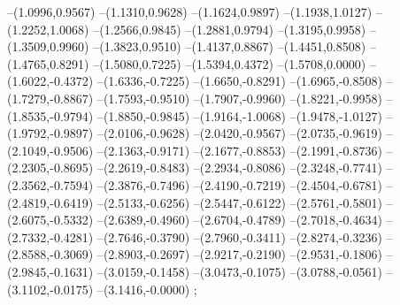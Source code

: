 {--(1.0996,0.9567)
--(1.1310,0.9628)
--(1.1624,0.9897)
--(1.1938,1.0127)
--(1.2252,1.0068)
--(1.2566,0.9845)
--(1.2881,0.9794)
--(1.3195,0.9958)
--(1.3509,0.9960)
--(1.3823,0.9510)
--(1.4137,0.8867)
--(1.4451,0.8508)
--(1.4765,0.8291)
--(1.5080,0.7225)
--(1.5394,0.4372)
--(1.5708,0.0000)
--(1.6022,-0.4372)
--(1.6336,-0.7225)
--(1.6650,-0.8291)
--(1.6965,-0.8508)
--(1.7279,-0.8867)
--(1.7593,-0.9510)
--(1.7907,-0.9960)
--(1.8221,-0.9958)
--(1.8535,-0.9794)
--(1.8850,-0.9845)
--(1.9164,-1.0068)
--(1.9478,-1.0127)
--(1.9792,-0.9897)
--(2.0106,-0.9628)
--(2.0420,-0.9567)
--(2.0735,-0.9619)
--(2.1049,-0.9506)
--(2.1363,-0.9171)
--(2.1677,-0.8853)
--(2.1991,-0.8736)
--(2.2305,-0.8695)
--(2.2619,-0.8483)
--(2.2934,-0.8086)
--(2.3248,-0.7741)
--(2.3562,-0.7594)
--(2.3876,-0.7496)
--(2.4190,-0.7219)
--(2.4504,-0.6781)
--(2.4819,-0.6419)
--(2.5133,-0.6256)
--(2.5447,-0.6122)
--(2.5761,-0.5801)
--(2.6075,-0.5332)
--(2.6389,-0.4960)
--(2.6704,-0.4789)
--(2.7018,-0.4634)
--(2.7332,-0.4281)
--(2.7646,-0.3790)
--(2.7960,-0.3411)
--(2.8274,-0.3236)
--(2.8588,-0.3069)
--(2.8903,-0.2697)
--(2.9217,-0.2190)
--(2.9531,-0.1806)
--(2.9845,-0.1631)
--(3.0159,-0.1458)
--(3.0473,-0.1075)
--(3.0788,-0.0561)
--(3.1102,-0.0175)
--(3.1416,-0.0000)
;}
